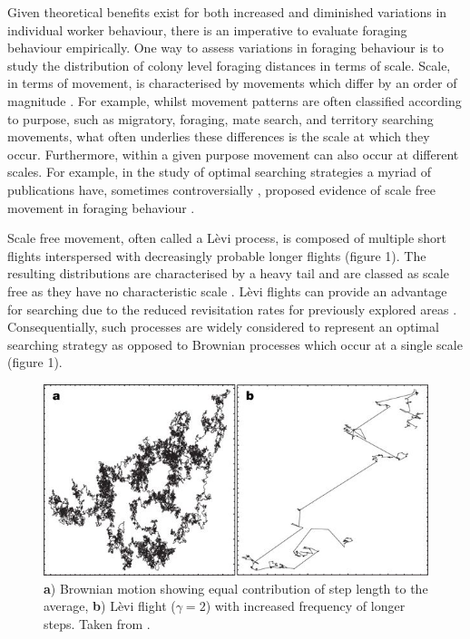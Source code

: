 \documentclass[11pt,usenames,dvipsnames]{article}
\begin{document}
\begin{linenumbers}
Given theoretical benefits exist for both increased and diminished variations in individual worker behaviour, there is an imperative to evaluate foraging behaviour empirically. One way to assess variations in foraging behaviour is to study the distribution of colony level foraging distances in terms of scale. Scale, in terms of movement, is characterised by movements which differ by an order of magnitude \citep{Levin1992}. For example, whilst movement patterns are often classified according to purpose, such as migratory, foraging, mate search, and territory searching movements, what often underlies these differences is the scale at which they occur. Furthermore, within a given purpose movement can also occur at different scales. For example, in the study of optimal searching strategies a myriad of publications have, sometimes controversially \citep{Viswanathan1996}, proposed evidence of scale free movement in foraging behaviour \citep{Harris2012, Ariel2015, Humphries2010, Baronchelli2013, Boyer, Ayala-Orozco2004, Sims2008, Viswanathan1999}.

Scale free movement, often called a L\`evi process, is composed of multiple short flights interspersed with decreasingly probable longer flights (figure 1). The resulting distributions are characterised by a heavy tail and are classed as scale free as they have no characteristic scale \citep{Reynolds2018}. L\`evi flights can provide an advantage for searching due to the reduced revisitation rates for previously explored areas \citep{Viswanathan1999}. Consequentially, such processes are widely considered to represent an optimal searching strategy \citep{Viswanathan1999,Humphries2014} as opposed to Brownian processes which occur at a single scale (figure 1).
\end{linenumbers}

\begin{figure}[H]
	\centering
	\includegraphics[scale=0.7]{LeviFlight.jpg}
	\caption{\textbf{a}) Brownian motion showing equal contribution of step length to the average, \textbf{b}) L\`evi flight ($\gamma = 2$) with increased frequency of longer steps. Taken from \cite{Barthelemy2008}.}
\end{figure}
\end{document}
